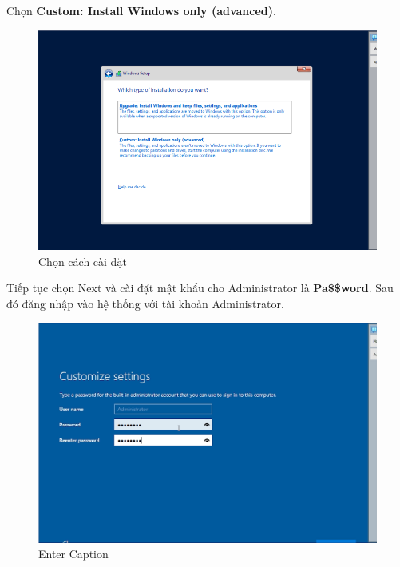 \newpage

 Chọn {\bf Custom: Install Windows only (advanced)}. 

\begin{figure}[!htb]
    \centering
    \includegraphics[width=1\linewidth]{figure//chapter4//lab4_1/select_setup_type.png}
    \caption{Chọn cách cài đặt}
    \label{fig:enter-label}
\end{figure}

 Tiếp tục chọn Next và cài đặt mật khẩu cho Administrator là {\bf Pa\$\$word}. Sau đó đăng nhập vào hệ thống với tài khoản Administrator.

\begin{figure}[!htb]
    \centering
    \includegraphics[width=1\linewidth]{figure//chapter4//lab4_1/enter_password.png}
    \caption{Enter Caption}
    \label{fig:enter-label}
\end{figure}

